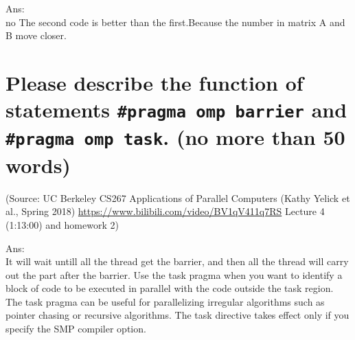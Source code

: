 \documentclass{article}
\begin{document}
Ans:%
~\\
no
The second code is better than the first.Because the number in matrix A and B move closer.
\section{Please describe the function of statements \texttt{\#pragma omp barrier} and \texttt{\#pragma omp task}. (no more than 50 words)}
(Source: UC Berkeley CS267 Applications of Parallel Computers (Kathy Yelick et al., Spring 2018) \url{https://www.bilibili.com/video/BV1qV411q7RS} Lecture 4 (1:13:00) and homework 2)

Ans:%
~\\It will wait untill all the thread get the barrier, and then all the thread will carry out the part after the barrier.
Use the task pragma when you want to identify a block of code to be executed in parallel with the code outside the task region. The task pragma can be useful for parallelizing irregular algorithms such as pointer chasing or recursive algorithms. The task directive takes effect only if you specify the SMP compiler option.


\end{document}
